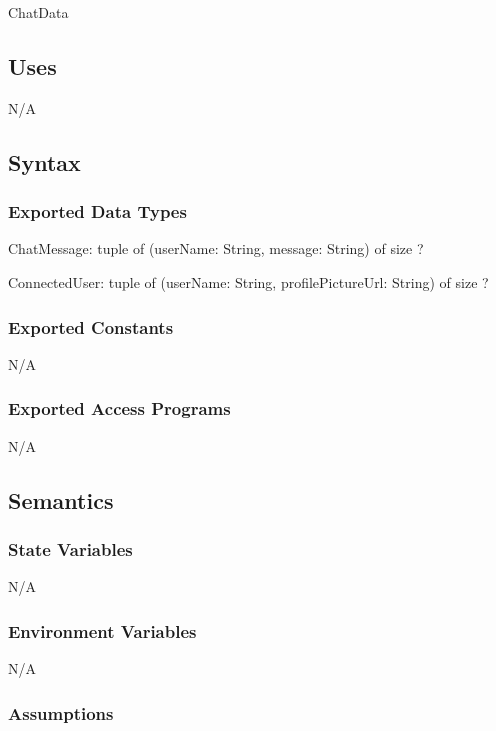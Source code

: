 \documentclass[12pt, titlepage]{article}
\begin{document}
	ChatData
	
	\subsection{Uses}
	
	N/A
	
	\subsection{Syntax}
	
	\subsubsection{Exported Data Types}
	
	ChatMessage: tuple of (userName: String, message: String) of size ?
	
	\noindent ConnectedUser: tuple of (userName: String, profilePictureUrl: String) of size ?
	
	\subsubsection{Exported Constants}
	
	N/A
	
	\subsubsection{Exported Access Programs}
	
	N/A
	
	\subsection{Semantics}
	
	\subsubsection{State Variables}
	
	N/A
	
	\subsubsection{Environment Variables}
	
	N/A
	
	\subsubsection{Assumptions}
	
\end{document}
